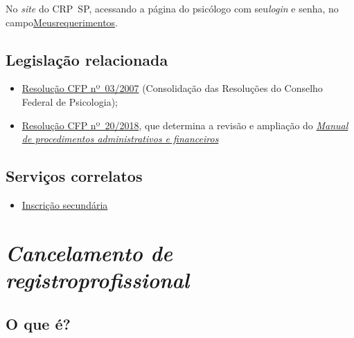 No \emph{site} do CRP~SP, acessando a página do psicólogo com seu\emph{login} e senha, no campo\href{https://cfpsp.brctotal.com/crp06_servicosonline/pgsRequerimento/MeusRequerimentos.aspx}{Meusrequerimentos}.

\section{Legislação relacionada}

\begin{itemize}
  \item  \href{https://atosoficiais.com.br/cfp/resolucao-administrativa-financeira-n-3-2007-institui-a-consolidacao-das-resolucoes-do-conselho-federal-de-psicologia?origin=instituicao&q=resolu\%C3\%A7\%C3\%A3o\%203/2007}{Resolução  CFP nº~03/2007} (Consolidação das Resoluções do Conselho Federal de  Psicologia);
  \item  \href{https://transparencia.cfp.org.br/wp-content/uploads/sites/7/2020/05/Manual-de-Procedimentos-Administrativos-e-Financeiro-CFP-RES-20.2018.pdf}{\href{https://atosoficiais.com.br/cfp/resolucao-administrativa-financeira-n-20-2018-altera-o-manual-de-procedimentos-administrativo-e-financeiro-do-sistema-conselhos-de-psicologia-anexo-da-resolucao-cfp-n-202018-a-resolucao-cfp-n-03-2007-a-resolucao-cfp-n-16-2019-e-da-outras-providencias}{Resolução  CFP nº~20/2018}}, que determina a revisão e ampliação do  \href{https://transparencia.cfp.org.br/wp-content/uploads/sites/7/2020/05/Manual-de-Procedimentos-Administrativos-e-Financeiro-CFP-RES-20.2018.pdf}{\emph{Manual  de procedimentos administrativos e financeiros}}
\end{itemize}

\section{Serviços correlatos}

\begin{itemize}
  \item  \hyperref[]{Inscrição secundária}
\end{itemize}

\chapter{\texorpdfstring{\emph{Cancelamento de registroprofissional}}{Cancelamento de registro profissional}}

\section{O que é?}

